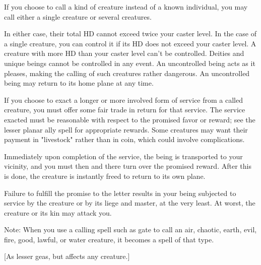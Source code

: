 {If you choose to call a kind of creature instead of a known individual, you may call either a single creature or several creatures.

In either case, their total HD cannot exceed twice your caster level. In the case of a single creature, you can control it if its HD does not exceed your caster level. A creature with more HD than your caster level can't be controlled. Deities and unique beings cannot be controlled in any event. An uncontrolled being acts as it pleases, making the calling of such creatures rather dangerous. An uncontrolled being may return to its home plane at any time.

If you choose to exact a longer or more involved form of service from a called creature, you must offer some fair trade in return for that service. The service exacted must be reasonable with respect to the promised favor or reward; see the lesser planar ally spell for appropriate rewards. Some creatures may want their payment in "livestock" rather than in coin, which could involve complications.

Immediately upon completion of the service, the being is transported to your vicinity, and you must then and there turn over the promised reward. After this is done, the creature is instantly freed to return to its own plane.

Failure to fulfill the promise to the letter results in your being subjected to service by the creature or by its liege and master, at the very least. At worst, the creature or its kin may attack you.

Note: When you use a calling spell such as gate to call an air, chaotic, earth, evil, fire, good, lawful, or water creature, it becomes a spell of that type.}
        
[As lesser geas, but affects any creature.]
        
